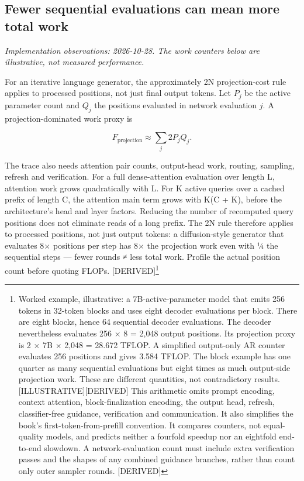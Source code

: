 \subsection{Fewer sequential evaluations can mean more total
work}\label{fewer-sequential-evaluations-can-mean-more-total-work}

\emph{Implementation observations: 2026-10-28. The work counters below
are illustrative, not measured performance.}

For an iterative language generator, the approximately 2N
projection-cost rule applies to processed positions, not just final
output tokens. Let \(P_j\) be the active parameter count and \(Q_j\) the
positions evaluated in network evaluation \(j\). A projection-dominated
work proxy is

\[F_{\text{projection}} \approx \sum_{j} 2 P_j Q_j.\]

The trace also needs attention pair counts, output-head work, routing,
sampling, refresh and verification. For a full dense-attention
evaluation over length L, attention work grows quadratically with L. For
K active queries over a cached prefix of length C, the attention main
term grows with K(C + K), before the architecture's head and layer
factors. Reducing the number of recomputed query positions does not
eliminate reads of a long prefix. The 2N rule therefore applies to
processed positions, not just output tokens: a diffusion-style generator
that evaluates 8× positions per step has 8× the projection work even
with ¼ the sequential steps --- fewer rounds ≠ less total work. Profile
the actual position count before quoting FLOPs. \mbox{{[}DERIVED{]}}\footnote{Worked
  example, illustrative: a 7B-active-parameter model that emits 256
  tokens in 32-token blocks and uses eight decoder evaluations per
  block. There are eight blocks, hence 64 sequential decoder
  evaluations. The decoder nevertheless evaluates 256 × 8 = 2,048 output
  positions. Its projection proxy is 2 × 7B × 2,048 = 28.672 TFLOP. A
  simplified output-only AR counter evaluates 256 positions and gives
  3.584 TFLOP. The block example has one quarter as many sequential
  evaluations but eight times as much output-side projection work. These
  are different quantities, not contradictory results.
  \mbox{{[}ILLUSTRATIVE{]}}\hspace{0pt}\mbox{{[}DERIVED{]}} This arithmetic omits prompt encoding,
  context attention, block-finalization encoding, the output head,
  refresh, classifier-free guidance, verification and communication. It
  also simplifies the book's first-token-from-prefill convention. It
  compares counters, not equal-quality models, and predicts neither a
  fourfold speedup nor an eightfold end-to-end slowdown. A
  network-evaluation count must include extra verification passes and
  the shapes of any combined guidance branches, rather than count only
  outer sampler rounds. \mbox{{[}DERIVED{]}}}

